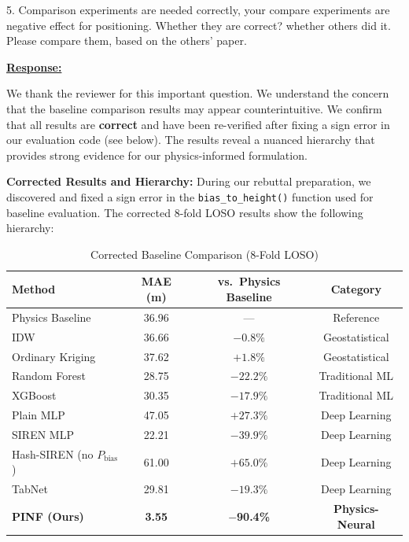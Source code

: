 \newpage

\begin{cmtthree}{}{}
5. Comparison experiments are needed correctly, your compare experiments are negative effect for positioning. Whether they are correct? whether others did it. Please compare them, based on the others' paper.

\end{cmtthree}
\vspace{0.1cm}
\noindent
\underline{\textbf{Response:}}
\vspace{0.2cm}

We thank the reviewer for this important question. We understand the concern that the baseline comparison results may appear counterintuitive. We confirm that all results are \textbf{correct} and have been re-verified after fixing a sign error in our evaluation code (see below). The results reveal a nuanced hierarchy that provides strong evidence for our physics-informed formulation.

\textbf{Corrected Results and Hierarchy:}
During our rebuttal preparation, we discovered and fixed a sign error in the \texttt{bias\_to\_height()} function used for baseline evaluation. The corrected 8-fold LOSO results show the following hierarchy:

\begin{table}[h]
\centering
\caption{Corrected Baseline Comparison (8-Fold LOSO)}
\begin{tabular}{lccc}
\toprule
\textbf{Method} & \textbf{MAE (m)} & \textbf{vs.\ Physics Baseline} & \textbf{Category} \\
\midrule
Physics Baseline & 36.96 & --- & Reference \\
\midrule
IDW & 36.66 & $-0.8\%$ & Geostatistical \\
Ordinary Kriging & 37.62 & $+1.8\%$ & Geostatistical \\
Random Forest & 28.75 & $-22.2\%$ & Traditional ML \\
XGBoost & 30.35 & $-17.9\%$ & Traditional ML \\
Plain MLP & 47.05 & $+27.3\%$ & Deep Learning \\
SIREN MLP & 22.21 & $-39.9\%$ & Deep Learning \\
Hash-SIREN (no $P_{\text{bias}}$) & 61.00 & $+65.0\%$ & Deep Learning \\
TabNet & 29.81 & $-19.3\%$ & Deep Learning \\
\midrule
\textbf{PINF (Ours)} & \textbf{3.55} & \textbf{$-$90.4\%} & \textbf{Physics-Neural} \\
\bottomrule
\end{tabular}
\end{table}

